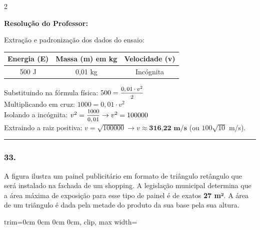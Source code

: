 \begin{multicols*}{2}
\ifgabarito
    \begin{tcolorbox}[colback=CorTitUm!5, colframe=CorTitUm, boxrule=1pt, arc=4pt, left=6pt, right=6pt, top=6pt, bottom=6pt]
    \small\textbf{\textcolor{CorTitUm}{Resolução do Professor:}}\par\vspace{0.1cm}
    \color{CinzaEscuro}
    Extração e padronização dos dados do ensaio:
    \vspace{0.1cm}
    \begin{center}
    \begin{tabular}{|c|c|c|}
    \hline
    \textbf{Energia (E)} & \textbf{Massa (m) em kg} & \textbf{Velocidade (v)} \\
    \hline
    500 J & 0,01 kg & Incógnita \\
    \hline
    \end{tabular}
    \end{center}
    \vspace{0.1cm}
    Substituindo na fórmula física: $500 = \mfrac{0,01 \cdot v^2}{2}$\\
    Multiplicando em cruz: $1000 = 0,01 \cdot v^2$\\
    Isolando a incógnita: $v^2 = \mfrac{1000}{0,01} \rightarrow v^2 = 100000$\\
    Extraindo a raiz positiva: $v = \sqrt{100000} \rightarrow v \approx \textbf{316,22 m/s}$ (ou $100\sqrt{10}$ m/s).
    \end{tcolorbox}
\fi

\par\vspace{\espacoQuestao}

\noindent\textcolor{CorLinha}{\rule{\linewidth}{0.5pt}} 
\par\vspace{\espacoPreQuestao}
\subsubsection*{33.} A figura ilustra um painel publicitário em formato de triângulo retângulo que será instalado na fachada de um shopping. A legislação municipal determina que a área máxima de exposição para esse tipo de painel é de exatos \textbf{27 m²}. A área de um triângulo é dada pela metade do produto da sua base pela sua altura.

\begin{center}
\begin{adjustbox}{trim=0cm 0cm 0cm 0cm, clip, max width=\larguraTikz}
\end{adjustbox}
\end{center}
\end{multicols*}
